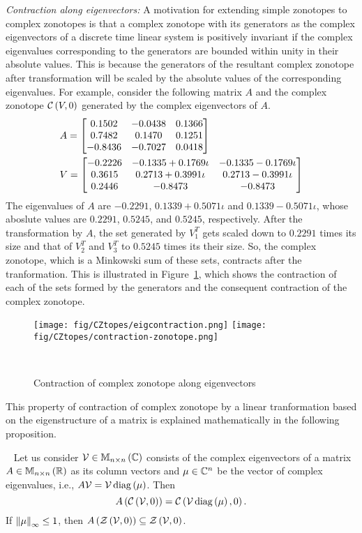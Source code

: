 \emph{Contraction along eigenvectors:  }  A motivation for extending
simple zonotopes to complex zonotopes is that a complex zonotope with
its generators as the complex eigenvectors of a discrete time linear
system is positively invariant if the complex eigenvalues
corresponding to the generators are bounded within unity in their
absolute values.  This is because the generators of the resultant
complex zonotope after transformation will be scaled by the absolute
values of the corresponding eigenvalues.  For example, consider the
following matrix $A$ and the complex zonotope
$\mathit{\mathcal{C}}\left(V,0\right)$ generated by the complex eigenvectors of $A$.
%
\begin{align*}
& A=\left[\begin{matrix}
0.1502 &  -0.0438  &  0.1366\\
    0.7482 &   0.1470  &  0.1251\\
   -0.8436 &  -0.7027  &  0.0418
\end{matrix}\right]\\
& V=\left[\begin{matrix}
-0.2226  &  -0.1335 + 0.1769\iota &  -0.1335 - 0.1769\iota\\
   0.3615 &   0.2713 + 0.3991\iota &  0.2713 - 0.3991\iota\\
   0.2446 & -0.8473 &   -0.8473 
\end{matrix}\right]
\end{align*}
%
The eigenvalues of $A$ are $-0.2291$, $0.1339 + 0.5071\iota$ and
${0.1339 - 0.5071\iota}$, whose aboslute values are $0.2291$,
$0.5245$, and $0.5245$, respectively.  After the transformation by
$A$, the set generated by $V^T_1$ gets scaled down to $0.2291$ times
its size and that of $V^T_2$ and $V^T_3$ to $0.5245$ times
its their size.  So, the complex zonotope, which is a Minkowski sum
of these sets, contracts after the tranformation.  This is illustrated
in Figure~\ref{fig:cz-scaled-down}, which shows the contraction of
each of the sets formed by the generators and the consequent
contraction of the complex zonotope.
%
\begin{figure}
\center
\texttt{[image: fig/CZtopes/eigcontraction.png]}
\texttt{[image: fig/CZtopes/contraction-zonotope.png]}
\caption{Contraction of complex zonotope along
eigenvectors}~\label{fig:cz-scaled-down}
\end{figure}
%
This property of contraction of complex zonotope by a linear
tranformation based on the eigenstructure of a matrix is explained
mathematically in the following proposition.
%
\begin{proposition}~\label{lem:eig-invariance}
Let us consider $\mathcal{V}\in\mathbb{M}_{n\times n}\left(\mathbb{C}\right)$ consists of the
complex eigenvectors of a matrix $A\in\mathbb{M}_{n\times n}\left(\mathbb{R}\right)$ as its
column vectors and $\mu\in\mathbb{C}^n$ be the vector of complex
eigenvalues, i.e., $A\mathcal{V} = \mathcal{V}\operatorname{diag}\left(\mu\right)$.
Then \[A\left(\mathit{\mathcal{C}}\left(\mathcal{V},0\right)\right)
= \mathit{\mathcal{C}}\left(\mathcal{V}\operatorname{diag}\left({\mu}\right),0\right).\]  If
$\left\|\mu\right\|_{\infty}\leq 1$, then
$A\left(\mathit{\mathcal{Z}}\left(\mathcal{V},0\right)\right)\subseteq \mathit{\mathcal{Z}}\left(\mathcal{V},0\right)$.
\end{proposition}
